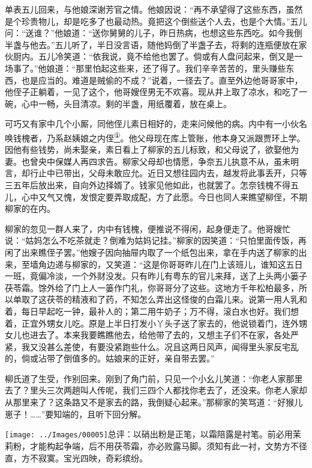 单表五儿回来，与他娘深谢芳官之情。他娘因说：``再不承望得了这些东西，虽然是个珍贵物儿，却是吃多了也最动热。竟把这个倒些送个人去，也是个大情。''五儿问：``送谁？''他娘道：``送你舅舅的儿子，昨日热病，也想这些东西吃。如今我倒半盏与他去。''五儿听了，半日没言语，随他妈倒了半盏子去，将剩的连瓶便放在家伙厨内。五儿冷笑道：``依我说，竟不给他也罢了。倘或有人盘问起来，倒又是一场事了。''他娘道：``那里怕起这些来，还了得了。我们辛辛苦苦的，里头赚些东西，也是应当的。难道是贼偷的不成？''说着，一径去了。直至外边他哥哥家中，他侄子正躺着，一见了这个，他哥嫂侄男无不欢喜。现从井上取了凉水，和吃了一碗，心中一畅，头目清凉。剩的半盏，用纸覆着，放在桌上。

可巧又有家中几个小厮，同他侄儿素日相好的，走来问候他的病。内中有一小伙名唤钱槐者，乃系赵姨娘之内侄\href{../Text/part0064_split_000.html\#lnkback_1_a}{\textsuperscript{①}}。他父母现在库上管账，他本身又派跟贾环上学。因他有些钱势，尚未娶亲，素日看上了柳家的五儿标致，和父母说了，欲娶他为妻。也曾央中保媒人再四求告。柳家父母却也情愿，争奈五儿执意不从，虽未明言，却行止中已带出，父母未敢应允。近日又想往园内去，越发将此事丢开，只等三五年后放出来，自向外边择婿了。钱家见他如此，也就罢了。怎奈钱槐不得五儿，心中又气又愧，发恨定要弄取成配，方了此愿。今日也同人来瞧望柳侄，不期柳家的在内。

柳家的忽见一群人来了，内中有钱槐，便推说不得闲，起身便走了。他哥嫂忙说：``姑妈怎么不吃茶就走？倒难为姑妈记挂。''柳家的因笑道：``只怕里面传饭，再闲了出来瞧侄子罢。''他嫂子因向抽屉内取了一个纸包出来，拿在手内送了柳家的出来，至墙角边递与柳家的，又笑道：``这是你哥哥昨儿在门上该班儿，谁知这五日一班，竟偏冷淡，一个外财没发。只有昨儿有粤东的官儿来拜，送了上头两小篓子茯苓霜。馀外给了门上人一篓作门礼，你哥哥分了这些。这地方千年松柏最多，所以单取了这茯苓的精液和了药，不知怎么弄出这怪俊的白霜儿来。说第一用人乳和着，每日早起吃一钟，最补人的；第二用牛奶子；万不得，滚白水也好。我们想着，正宜外甥女儿吃。原是上半日打发小丫头子送了家去的，他说锁着门，连外甥女儿也进去了。本来我要瞧瞧他去，给他带了去的，又想主子们不在家，各处严紧，我又没甚么差使，有要没紧跑些什么。况且这两日风声，闻得里头家反宅乱的，倘或沾带了倒值多的。姑娘来的正好，亲自带去罢。''

柳氏道了生受，作别回来。刚到了角门前，只见一个小幺儿笑道：``你老人家那里去了？里头三次两趟叫人传呢，我们三四个人都找你老去了，还没来。你老人家却从那里来了？这条路又不是家去的路，我倒疑心起来。''那柳家的笑骂道：``好猴儿崽子！\ldots{}\ldots{}''要知端的，且听下回分解。

{\texttt{[image: ../Images/00005]}总评：以硝出粉是正笔，以霜陪露是衬笔。前必用茉莉粉，才能构起争端，后不用茯苓霜，亦必败露马脚。须知有此一衬，文势方不径直，方不寂寞。宝光四映，奇彩缤纷。}


